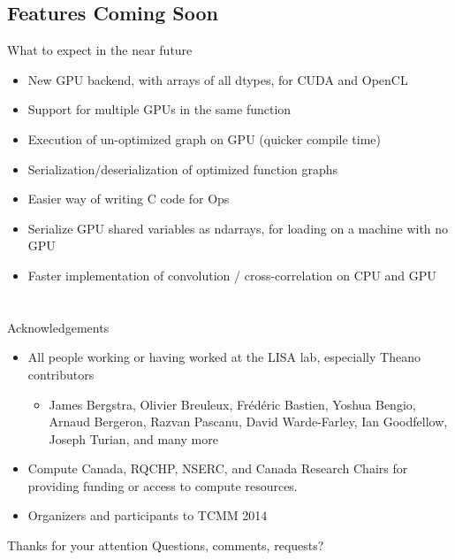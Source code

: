 \documentclass[a4paper,9pt]{beamer}
\begin{document}
\subsection{Features Coming Soon}
\begin{frame}{What to expect in the near future}
  \begin{itemize}
    \item New GPU backend, with arrays of all dtypes, for CUDA and OpenCL
    \item Support for multiple GPUs in the same function
    \item Execution of un-optimized graph on GPU (quicker compile time)
    \item Serialization/deserialization of optimized function graphs
    \item Easier way of writing C code for Ops
    \item Serialize GPU shared variables as ndarrays, for loading on a machine with no GPU
    \item Faster implementation of convolution / cross-correlation on CPU and GPU
  \end{itemize}
\end{frame}


\section{}

\begin{frame}{Acknowledgements}
  \begin{itemize}
    \item All people working or having worked at the LISA lab, especially Theano contributors
      \begin{itemize}
        \item James Bergstra, Olivier Breuleux, Frédéric Bastien, Yoshua Bengio, Arnaud Bergeron, Razvan Pascanu, David Warde-Farley, Ian Goodfellow, Joseph Turian, and many more
      \end{itemize}
    \item Compute Canada, RQCHP, NSERC, and Canada Research Chairs for providing funding or access to compute resources.
    \item Organizers and participants to TCMM 2014
  \end{itemize}
\end{frame}

\begin{frame}{Thanks for your attention}
  Questions, comments, requests?
\end{frame}
\end{document}
